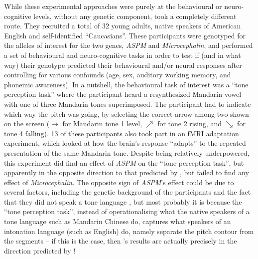 \documentclass[twoside,onecolumn]{article}
\begin{document}
While these experimental approaches were purely at the behavioural or neuro-cognitive levels, without any genetic component, \citet{wong_plosone_2012} took a completely different route.
They recruited a total of 32 young adults, native speakers of American English and self-identified ``Caucasians''.
These participants were genotyped for the alleles of interest for the two genes, \textit{ASPM} and \textit{Microcephalin}, and performed a set of behavioural and neuro-cognitive tasks in order to test if (and in what way) their genotype predicted their behavioural and/or neural responses after controlling for various confounds (age, sex, auditory working memory, and phonemic awareness).
In a nutshell, the behavioural task of interest was a ``tone perception task'' where the participant heard a resynthesized Mandarin vowel with one of three Mandarin tones superimposed.
The participant had to indicate which way the pitch was going, by selecting the correct arrow among two shown on the screen ($\rightarrow$ for Mandarin tone 1 level, $\nearrow$ for tone 2 rising, and $\searrow$ for tone 4 falling).
13 of these participants also took part in an fMRI adaptation experiment, which looked at how the brain's response ``adapts'' to the repeated presentation of the same Mandarin tone.
Despite being relatively underpowered, this experiment did find an effect of \textit{ASPM} on the ``tone perception task'', but apparently in the opposite direction to that predicted by \citet{dediu_ladd_2007}, but failed to find any effect of \textit{Microcephalin}.
The opposite sign of \textit{ASPM}'s effect could be due to several factors, including the genetic background of the participants and the fact that they did not speak a tone language \citet{wong_plosone_2012}, but most probably it is because the ``tone perception task'', instead of operationalising what the native speakers of a tone language such as Mandarin Chinese do, captures what speakers of an intonation language (such as English) do, namely separate the pitch contour from the segments \citep[p. 340]{caldwellharris_factors_2015} -- if this is the case, then \citet{wong_plosone_2012}'s results are actually precisely in the direction predicted by \citet{dediu_ladd_2007}!
\end{document}
